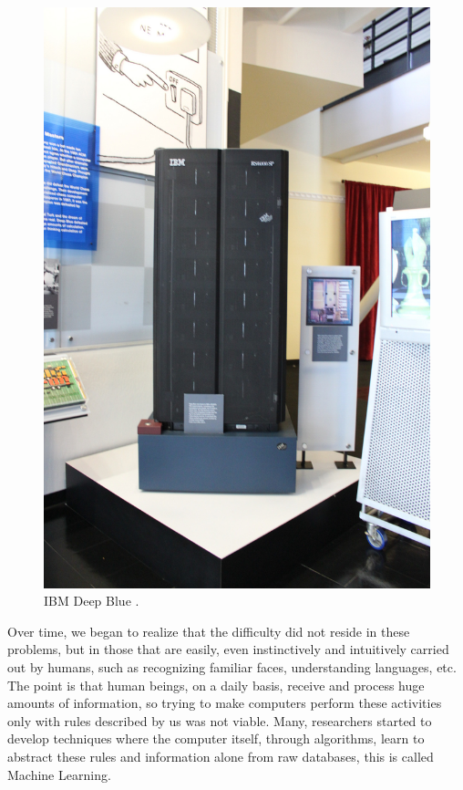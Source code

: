 \begin{figure}
    \centering
    \includegraphics[scale=0.1]{figure100.jpg}
    \caption{IBM Deep Blue \cite{img:deepblue}.}
    \label{fig:figure100}
\end{figure}
\newpage

Over time, we began to realize that the difficulty did not reside in these problems, but in those that are easily, even instinctively and intuitively carried out by humans, such as recognizing familiar faces, understanding languages, etc. The point is that human beings, on a daily basis, receive and process huge amounts of information, so trying to make computers perform these activities only with rules described by us was not viable. Many, researchers started to develop techniques where the computer itself, through algorithms, learn to abstract these rules and information alone from raw databases, this is called Machine Learning.

